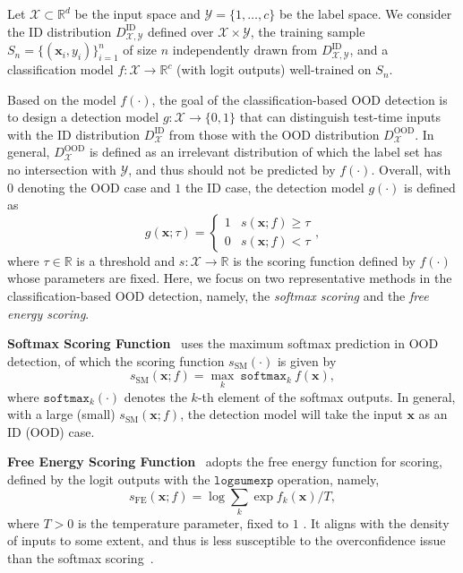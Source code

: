\documentclass{article}
\begin{document}
Let $\mathcal{X}\subset\mathbb{R}^d$ be the input space and $\mathcal{Y}=\{1,\ldots, c\}$ be the label space. We consider the ID distribution $D^\text{ID}_{\mathcal{X}, \mathcal{Y}}$ defined over $\mathcal{X}\times\mathcal{Y}$, the training sample $S_n=\{(\boldsymbol{x}_i,y_i)\}_{i=1}^n$ of size $n$ independently drawn from $D^\text{ID}_{\mathcal{X}, \mathcal{Y}}$, and a classification model ${f}:\mathcal{X}\rightarrow\mathbb{R}^c$ (with logit outputs) well-trained on $S_n$. 

Based on the model $f(\cdot)$, the goal of the classification-based OOD detection is to design a detection model $g:\mathcal{X}\rightarrow\{0,1\}$ that can distinguish test-time inputs 
with the ID distribution $D^\text{ID}_{\mathcal{X}}$ from those with the OOD distribution $D^\text{OOD}_{\mathcal{X}}$. In general, $D^\text{OOD}_{\mathcal{X}}$ is defined as an irrelevant distribution of which the label set has no intersection with $\mathcal{Y}$, and thus should not be predicted by $f(\cdot)$. 
Overall, with $0$ denoting the OOD case and $1$ the ID case, the detection model $g(\cdot)$ is defined as 
\begin{equation}
    g(\boldsymbol{x};\tau)=\begin{cases} 1 & {s}(\boldsymbol{x};f) \ge \tau \\ 0 & {s}(\boldsymbol{x};f) < \tau \end{cases}, \label{eq: tau}
\end{equation}
where $\tau\in\mathbb{R}$ is a threshold and $s:\mathcal{X}\rightarrow \mathbb{R}$ is the scoring function defined by $f(\cdot)$ whose parameters are fixed. Here, we focus on two representative methods in the classification-based OOD detection, namely, the \emph{softmax scoring} and the \emph{free energy scoring}. 

\textbf{Softmax Scoring Function}~\cite{hendrycks2016baseline} uses the maximum softmax prediction in OOD detection, of which the scoring function $s_\text{SM}(\cdot)$ is given by
\begin{equation}
    s_\text{SM}(\boldsymbol{x};f) = \max_k~\texttt{softmax}_k~f(\boldsymbol{x}),  \label{eq: softmax score}
\end{equation}
where $\texttt{softmax}_k (\cdot)$ denotes the $k$-th element of the softmax outputs. In general, with a large (small) $s_\text{SM}(\boldsymbol{x};f)$, the detection model will take the input $\boldsymbol{x}$ as an ID (OOD) case. 

\textbf{Free Energy Scoring Function}~\cite{liu2020energy} adopts the free energy function for scoring, defined by the logit outputs with the $\texttt{logsumexp}$ operation, namely,
\begin{equation}
    {s_\text{FE}(\boldsymbol{x};f) = \log \sum_k \exp {f_k(\boldsymbol{x})}/{T},} \label{eq: free energy score}
\end{equation}
where $T>0$ is the temperature parameter, fixed to $1$ \cite{liu2020energy}. It aligns with the density of inputs to some extent, and thus is less susceptible to the overconfidence issue than the softmax scoring~\cite{liu2020energy}. 
\end{document}
